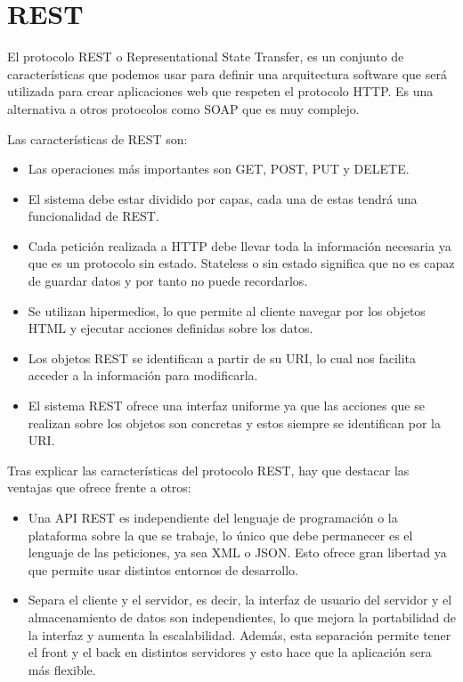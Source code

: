 \section{REST}
El protocolo REST \cite{rest} o Representational State Transfer, es un conjunto de características que podemos usar para definir una arquitectura software que será utilizada para crear aplicaciones web que respeten el protocolo HTTP. Es una alternativa a otros protocolos como SOAP que es muy complejo.

Las características de REST son:
\begin{itemize}
\tightlist
    \item Las operaciones más importantes son GET, POST, PUT y DELETE.
    \item El sistema debe estar dividido por capas, cada una de estas tendrá una funcionalidad de REST.
    \item Cada petición realizada a HTTP debe llevar toda la información necesaria ya que es un protocolo sin estado. Stateless o sin estado significa que no es capaz de guardar datos y por tanto no puede recordarlos.
    \item Se utilizan hipermedios, lo que permite al cliente navegar por los objetos HTML y ejecutar acciones definidas sobre los datos.
    \item Los objetos REST se identifican a partir de su URI, lo cual nos facilita acceder a la información para modificarla.
    \item El sistema REST ofrece una interfaz uniforme ya que las acciones que se realizan sobre los objetos son concretas y estos siempre se identifican por la URI.
\end{itemize}

Tras explicar las características del protocolo REST, hay que destacar las ventajas que ofrece frente a otros:
\begin{itemize}
\tightlist
    \item Una API REST es independiente del lenguaje de programación o la plataforma sobre la que se trabaje, lo único que debe permanecer es el lenguaje de las peticiones, ya sea XML o JSON. Esto ofrece gran libertad ya que permite usar distintos entornos de desarrollo.
    \item Separa el cliente y el servidor, es decir, la interfaz de usuario del servidor y el almacenamiento de datos son independientes, lo que mejora la portabilidad de la interfaz y aumenta la escalabilidad. Además, esta separación permite tener el front y el back en distintos servidores y esto hace que la aplicación sera más flexible.
\end{itemize}

